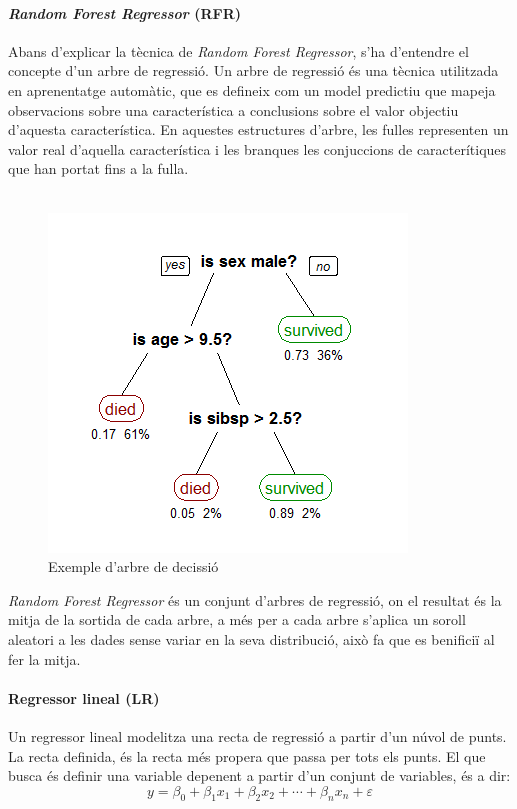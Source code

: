 \documentclass[12pt,a4paper,catalan]{article}
\begin{document}
\paragraph{\textit{Random Forest Regressor} (RFR)}
Abans d'explicar la tècnica de \textit{Random Forest Regressor}, s'ha d'entendre el concepte d'un arbre de regressió. Un arbre de regressió és una tècnica utilitzada en aprenentatge automàtic, que es defineix com un model predictiu que mapeja observacions sobre una característica a conclusions sobre el valor objectiu d'aquesta característica. En aquestes estructures d'arbre, les fulles representen un valor real d'aquella característica i les branques les conjuccions de caracterítiques que han portat fins a la fulla.
\\
\\
\begin{figure}[h]
\centering
\includegraphics[width=.5\linewidth]{img/randomforest.png}
\caption{Exemple d'arbre de decissió \cite{imgrandomforestregressor}}
\end{figure}

\textit{Random Forest Regressor} \cite{randomforestregressor} és un conjunt d'arbres de regressió, on el resultat és la mitja de la sortida de cada arbre, a més per a cada arbre s'aplica un soroll aleatori a les dades sense variar en la seva distribució, això fa que es benificiï al fer la mitja. 

\newpage

\paragraph{Regressor lineal (LR)}
Un regressor lineal \cite{linearregressor} modelitza una recta de regressió a partir d'un núvol de punts. La recta definida, és la recta més propera que passa per tots els punts. El que busca és definir una variable depenent a partir d'un conjunt de variables, és a dir:
$$
y =\beta_0+\beta_1 x_1+\beta_2 x_2+ \cdots + \beta_n x_n + \varepsilon
$$
\end{document}
